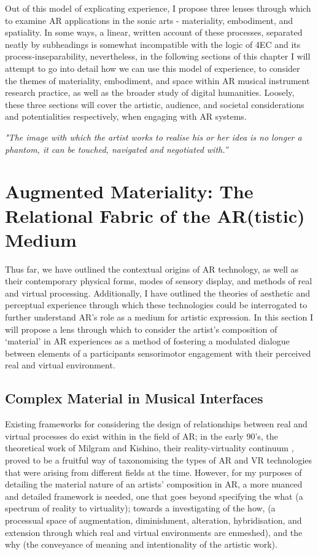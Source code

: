 Out of this model of explicating experience, I propose three lenses through which to examine AR applications in the sonic arts - materiality, embodiment, and spatiality. In some ways, a linear, written account of these processes, separated neatly by subheadings is somewhat incompatible with the logic of 4EC and its process-inseparability, nevertheless, in the following sections of this chapter I will attempt to go into detail how we can use this model of experience, to consider the themes of materiality, embodiment, and space within AR musical instrument research practice, as well as the broader study of digital humanities. Loosely, these three sections will cover the artistic, audience, and societal considerations and potentialities respectively, when engaging with AR systems.



\epigraph{\textit{"The image with which the artist works to realise his or her idea is no longer a phantom, it can be touched, navigated and negotiated with.”}}{\citep[p.5]{ryan1991}}

\section[Augmented Materiality]{Augmented Materiality: The Relational Fabric of the AR(tistic) Medium}\label{sec: theory-materiality}
Thus far, we have outlined the contextual origins of AR technology, as well as their contemporary physical forms, modes of sensory display, and methods of real and virtual processing. Additionally, I have outlined the theories of aesthetic and perceptual experience through which these technologies could be interrogated to further understand AR’s role as a medium for artistic expression. In this section I will propose a lens through which to consider the artist’s composition of ‘material’ in AR experiences as a method of fostering a modulated dialogue between elements of a participants sensorimotor engagement with their perceived real and virtual environment. 

\subsection{Complex Material in Musical Interfaces}\label{sec: theory-materiality-complexitymusic}
Existing frameworks for considering the design of relationships between real and virtual processes do exist within in the field of AR; in the early 90’s, the theoretical work of Milgram and Kishino, their reality-virtuality continuum \citeyearpar[p. 10]{milgram1994}, proved to be a fruitful way of taxonomising the types of AR and VR technologies that were arising from different fields at the time. However, for my purposes of detailing the material nature of an artists’ composition in AR, a more nuanced and detailed framework is needed, one that goes beyond specifying the what (a spectrum of reality to virtuality); towards a investigating of the how, (a processual space of augmentation, diminishment, alteration, hybridisation, and extension through which real and virtual environments are enmeshed), and the why (the conveyance of meaning and intentionality of the artistic work). 


